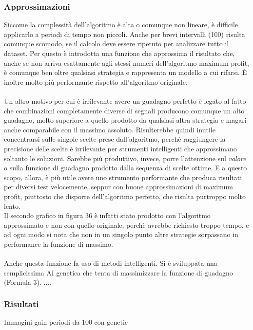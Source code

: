 \documentclass[a4paper,12pt]{report}
\begin{document}
\begin{fig}
\subsubsection{Approssimazioni}
Siccome la complessità dell'algoritmo è alta o comunque non lineare, è difficile applicarlo a periodi di tempo non piccoli. Anche per brevi intervalli (100) risulta comunque scomodo, se il calcolo deve essere ripetuto per analizzare tutto il dataset. Per questo è introdotta una funzione che approssima il risultato che, anche se non arriva esattamente agli stessi numeri dell'algoritmo maximum profit, è comunque ben oltre qualsiasi strategia e rappresenta un modello a cui rifarsi. È inoltre molto più performante rispetto all'algoritmo originale.\\~\\
Un altro motivo per cui è irrilevante avere un guadagno perfetto è legato al fatto che combinazioni completamente diverse di segnali producono comunque un alto guadagno, molto superiore a quello prodotto da qualsiasi altra strategia e magari anche comparabile con il massimo assoluto. Risulterebbe quindi inutile concentrarsi sulle singole scelte prese dall'algoritmo, perchè raggiungere la precisione delle scelte è irrilevante per strumenti intelligenti che approssimano soltanto le soluzioni. Sarebbe più produttivo, invece, porre l'attenzione sul \textit{valore} o sulla funzione di guadagno prodotto dalla sequenza di scelte ottime. E a questo scopo, allora, è più utile avere uno strumento performante che produca risultati per diversi test velocemente, seppur con buone approssimazioni di maximum profit, piuttosto che disporre dell'algoritmo perfetto, che risulta purtroppo molto lento.\\ Il secondo grafico in figura 36 è infatti stato prodotto con l'algoritmo approssimato e non con quello originale, perchè avrebbe richiesto troppo tempo, e ad ogni modo si nota che non in un singolo punto altre strategie sorpassano in performance la funzione di massimo.\\~\\ 

Anche questa funzione fa uso di metodi intelligenti. Si è sviluppata una semplicissima AI genetica che tenta di massimizzare la funzione di guadagno (Formula 3). ....


\subsubsection{Risultati}
Immagini gain periodi da 100 con genetic


\end{fig}
\end{document}
